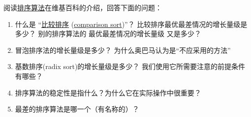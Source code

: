 \begin{exercise}


阅读\href{http://en.wikipedia.org/wiki/Sorting_algorithm}{排序算法}在维基百科的介绍，回答下面的问题：

\begin{enumerate}


\item 什么是 ``\href{https://zh.wikipedia.org/wiki/%E6%AF%94%E8%BE%83%E6%8E%92%E5%BA%8F}{比较排序} (\href{https://en.wikipedia.org/wiki/Comparison_sort}{comparison sort})''？  比较排序最优最差情况的增长量级是多少？  别的排序算法的 最优最差情况的增长量级 又是多少？


\item 冒泡排序法的增长量级是多少？ 为什么奥巴马认为是``不应采用的方法''


\item 基数排序(radix sort)的增长量级是多少？ 我们使用它所需要注意的前提条件有哪些？


\item 排序算法的稳定性是指什么？为什么它在实际操作中很重要？


\item 最差的排序算法是哪一个（有名称的）？



\end{enumerate}
\end{exercise}

